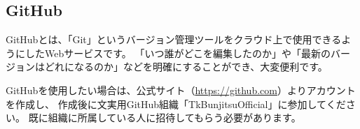 \begin{multicols*}{2}
\section{GitHub}
GitHubとは、「Git」というバージョン管理ツールをクラウド上で使用できるようにしたWebサービスです。
「いつ誰がどこを編集したのか」や「最新のバージョンはどれになるのか」などを明確にすることができ、大変便利です。

GitHubを使用したい場合は、公式サイト（\url{https://github.com}）よりアカウントを作成し、
作成後に文実用GitHub組織「TkBunjitsuOfficial」に参加してください。
既に組織に所属している人に招待してもらう必要があります。
\end{multicols*}
